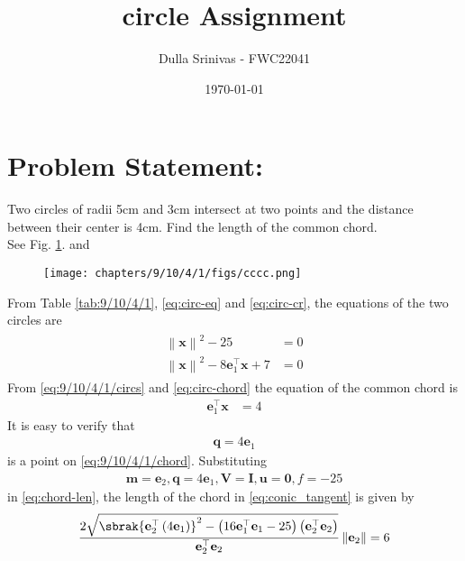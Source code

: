 \documentclass[journal,12pt,twocolumn]{article}
\title{\textbf{circle Assignment}}
\author{Dulla Srinivas - FWC22041}
\date{\today}
\providecommand{\norm}[1]{\left\lVert#1\right\rVert}
\let\vec\mathbf
\providecommand{\brak}[1]{\ensuremath{\left(#1\right)}}
\begin{document}
\maketitle
\section*{Problem Statement:}
\fi
Two circles of radii 5cm and 3cm intersect at two points and the distance between their center is 4cm. Find the length of the common chord.
\\
\solution 
See Fig. 
		\ref{fig:9/10/4/1}.
		and
	\begin{figure}[H]
		\centering
 \texttt{[image: chapters/9/10/4/1/figs/cccc.png]}
		\caption{}
		\label{fig:9/10/4/1}
  	\end{figure}

	\begin{table}[H]
		\centering
 
		\caption{}
		\label{tab:9/10/4/1}
  	\end{table}
	From 
		Table 
		\ref{tab:9/10/4/1},
	\eqref{eq:circ-eq}
	and
	\eqref{eq:circ-cr},
	the equations of the two circles are
\begin{align}
	\begin{split}
	\norm{\vec{x}}^2 -25 &= 0
	\\
	\norm{\vec{x}}^2 - 8 \vec{e}_1^{\top}\vec{x} +7 &= 0
	\end{split}
		\label{eq:9/10/4/1/circs}
\end{align}
From 
		\eqref{eq:9/10/4/1/circs}
and
	\eqref{eq:circ-chord}
the equation of the common chord is 
\begin{align}
	   \vec{e}_1^{\top}\vec{x} 
	   &= 4
		\label{eq:9/10/4/1/chord}
\end{align}
%
It is easy to verify that 
\begin{align}
	\vec{q} = 4\vec{e}_1
\end{align}
is a point on 
		\eqref{eq:9/10/4/1/chord}.
		Substituting
\begin{align}
\vec{m} = \vec{e}_2, \vec{q} = 4\vec{e}_1, 
\vec{V}=\vec{I}, \vec{u} = \vec{0}, f = -25
\end{align}
in 
\eqref{eq:chord-len},
		the length of the chord in 
\eqref{eq:conic_tangent}
is given by 
\begin{align}
 \frac{2\sqrt{
\sbrak{
\vec{e}_2^{\top}\brak{4\vec{e}_1}
}^2
-
\brak
{
16\vec{e}_1^{\top}\vec{e}_1 -25
}
\brak{\vec{e}_2^{\top}\vec{e}_2}
}
}
{
\vec{e}_2^{\top}\vec{e}_2
}\norm{\vec{e}_2}
= 6
  \end{align}
	
\end{document}
